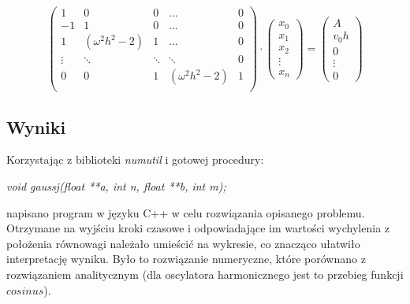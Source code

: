 \begin{equation}
\begin{pmatrix}
1      & 0 				 & 0      &\dots  			& 0  \\
-1     & 1               & 0      &\dots  			& 0  \\
1  	   & (\omega^2h^2-2) & 1      &\dots  			& 0  \\
\vdots & \ddots          & \ddots &\ddots 			& 0  \\
0      & 0               & 1 	  &(\omega^2h^2-2)  & 1  \\
\end{pmatrix}
\cdot
\begin{pmatrix}
x_0 \\
x_1 \\
x_2 \\
\vdots \\
x_n
\end{pmatrix}
= 
\begin{pmatrix}
A \\
v_0h \\
0 \\
\vdots \\
0
\end{pmatrix}
\label{ogolna}
\end{equation}

\subsection{Wyniki}
Korzystając z biblioteki \textit{numutil} i gotowej procedury: \begin{center}
	\textit{void gaussj(float **a, int n, float **b, int m);}
\end{center}
napisano program w języku C++ w celu rozwiązania opisanego problemu. Otrzymane na wyjściu kroki czasowe i odpowiadające im wartości wychylenia z położenia równowagi należało umieścić na wykresie, co znacząco ułatwiło interpretację wyniku. Było to rozwiązanie numeryczne, które porównano z rozwiązaniem analitycznym (dla oscylatora harmonicznego jest to przebieg funkcji $ cosinus $).

